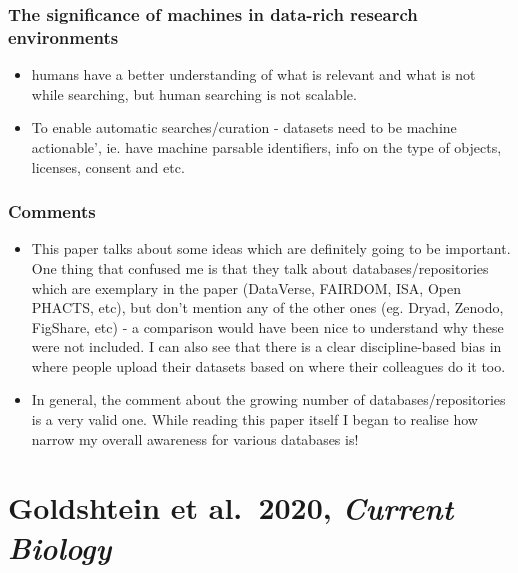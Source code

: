 \documentclass[
]{book}
\providecommand{\tightlist}{%
  \setlength{\itemsep}{0pt}\setlength{\parskip}{0pt}}
\begin{document}
\hypertarget{the-significance-of-machines-in-data-rich-research-environments}{%
\subsection{The significance of machines in data-rich research environments}\label{the-significance-of-machines-in-data-rich-research-environments}}

\begin{itemize}
\tightlist
\item
  humans have a better understanding of what is relevant and what is not while searching, but human searching is not scalable.
\item
  To enable automatic searches/curation - datasets need to be machine actionable', ie. have machine parsable identifiers, info on the type of objects, licenses, consent and etc.
\end{itemize}

\hypertarget{comments-7}{%
\subsection{Comments}\label{comments-7}}

\begin{itemize}
\tightlist
\item
  This paper talks about some ideas which are definitely going to be important. One thing that confused me is that they talk about databases/repositories which are exemplary in the paper (DataVerse, FAIRDOM, ISA, Open PHACTS, etc), but don't mention any of the other ones (eg. Dryad, Zenodo, FigShare, etc) - a comparison would have been nice to understand why these were not included. I can also see that there is a clear discipline-based bias in where people upload their datasets based on where their colleagues do it too.
\item
  In general, the comment about the growing number of databases/repositories is a very valid one. While reading this paper itself I began to realise how narrow my overall awareness for various databases is!
\end{itemize}

\hypertarget{goldshtein-et-al.-2020-current-biology}{%
\chapter{\texorpdfstring{Goldshtein et al.~2020, \emph{Current Biology}}{Goldshtein et al.~2020, Current Biology}}\label{goldshtein-et-al.-2020-current-biology}}
\end{document}
